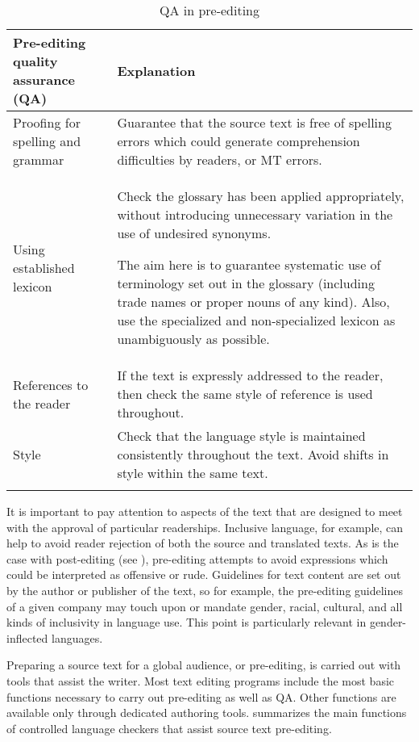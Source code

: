 \documentclass[output=paper,colorlinks,citecolor=brown,
]{langscibook}
\begin{document}
\begin{table}[t]
\begin{tabularx}{\textwidth}{QQ}
\lsptoprule
{Pre-editing quality assurance (QA)} & {Explanation}\\
\midrule

Proofing for spelling and grammar & Guarantee that the source text is free of spelling errors which could generate comprehension difficulties by readers, or MT errors.\\
\tablevspace

Using established lexicon & Check the glossary has been applied appropriately, without introducing unnecessary variation in the use of undesired synonyms.

The aim here is to guarantee systematic use of terminology set out in the glossary (including trade names or proper nouns of any kind). Also, use the specialized and non-specialized lexicon as unambiguously as possible.\\
\tablevspace

References to the reader & If the text is expressly addressed to the reader, then check the same style of reference is used throughout.\\
\tablevspace


Style & Check that the language style is maintained consistently throughout the text. Avoid shifts in style within the same text. \\
\lspbottomrule
\end{tabularx}
\caption{QA in pre-editing}
\label{tab:sanchez:4}
\end{table}

It is important to pay attention to aspects of the text that are designed to meet with the approval of particular readerships. Inclusive language, for example, can help to avoid reader rejection of both the source and translated texts. As is the case with post-editing (see ), pre-editing attempts to avoid expressions which could be interpreted as offensive or rude. Guidelines for text content are set out by the author or publisher of the text, so for example, the pre-editing guidelines of a given company may touch upon or mandate gender, racial, cultural, and all kinds of inclusivity in language use. This point is particularly relevant in gender-inflected languages.

Preparing a source text for a global audience, or pre-editing, is carried out with tools that assist the writer. Most text editing programs include the most basic functions necessary to carry out pre-editing as well as QA. Other functions are available only through dedicated authoring tools.  summarizes the main functions of controlled language checkers that assist source text pre-editing.
\end{document}
